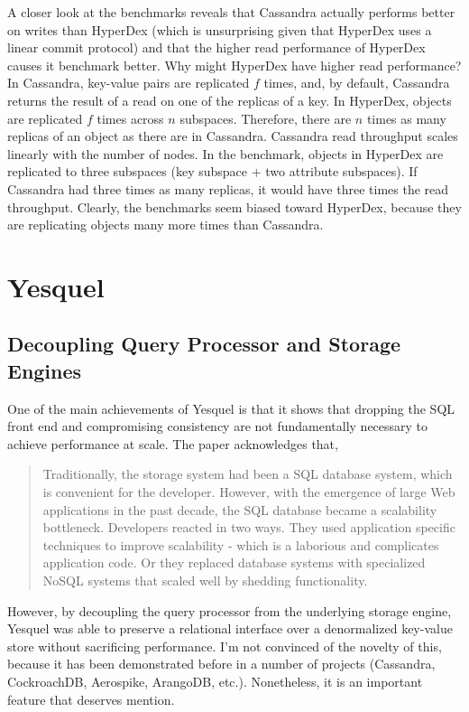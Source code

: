 \documentclass[journal]{../styles/IEEEtran}
\begin{document}
  A closer look at the benchmarks reveals that Cassandra actually performs better on writes than 
  HyperDex (which is unsurprising given that HyperDex uses a linear commit protocol) and that the 
  higher read performance of HyperDex causes it benchmark better. Why might HyperDex have higher 
  read performance? In Cassandra, key-value pairs are replicated $f$ times, and, by default, 
  Cassandra returns the result of a read on one of the replicas of a key. In HyperDex, objects are 
  replicated $f$ times across $n$ subspaces. Therefore, there are $n$ times as many replicas of an 
  object as there are in Cassandra. Cassandra read throughput scales linearly with the number of 
  nodes. In the benchmark, objects in HyperDex are replicated to three subspaces (key subspace + two 
  attribute subspaces). If Cassandra had three times as many replicas, it would have three times the 
  read throughput. Clearly, the benchmarks seem biased toward HyperDex, because they are replicating 
  objects many more times than Cassandra.

\section{Yesquel}

  \subsection{Decoupling Query Processor and Storage Engines}
  One of the main achievements of Yesquel is that it shows that dropping the SQL front end and 
  compromising consistency are not fundamentally necessary to achieve performance at scale. The
  paper acknowledges that, 
  
    \begin{quote}
    Traditionally, the storage system had been a SQL database system, which is convenient for the
    developer. However, with the emergence of large Web applications in the past decade, the SQL
    database became a scalability bottleneck. Developers reacted in two ways. They used application
    specific techniques to improve scalability - which is a laborious and complicates application
    code. Or they replaced database systems with specialized NoSQL systems that scaled well by
    shedding functionality.
    \end{quote}

  However, by decoupling the query processor from the underlying storage engine, Yesquel was able to
  preserve a relational interface over a denormalized key-value store without sacrificing
  performance. I'm not convinced of the novelty of this, because it has been demonstrated before in
  a number of projects (Cassandra, CockroachDB, Aerospike, ArangoDB, etc.). Nonetheless, it is an
  important feature that deserves mention.  
\end{document}
